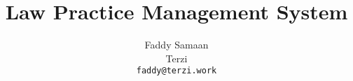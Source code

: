 \documentclass[12pt,a4paper,titlepage]{article}
\begin{document}
\title{Law Practice Management System}
\author{Faddy Samaan\\ Terzi\\ \texttt{faddy@terzi.work}}
\maketitle
\end{document}
